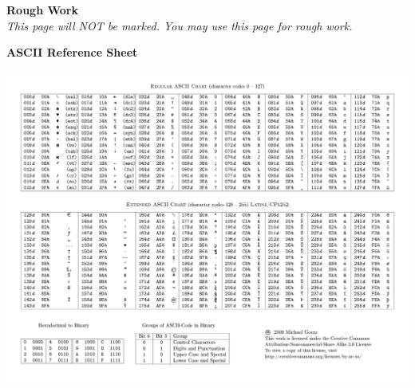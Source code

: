 \documentclass[letterpaper,12pt,addpoints]{exam}
\begin{document}
    \clearpage
    \begin{center}
        \textbf{Rough Work}\\
        \textit{This page will NOT be marked. You may use this page for rough work.}
    \end{center}
    \clearpage
    \begin{center}
        \textbf{ASCII Reference Sheet}
        
        \includegraphics[width=0.8\textheight, angle=270]{ascii.jpg}
    \end{center}
\end{document}
